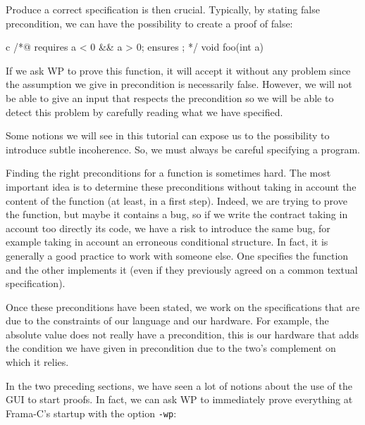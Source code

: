 Produce a correct specification is then crucial. Typically, by stating
false precondition, we can have the possibility to create a proof of
false:



\begin{CodeBlock}{c}
/*@
  requires a < 0 && a > 0;
  ensures  \false;
*/
void foo(int a){

}
\end{CodeBlock}


If we ask WP to prove this function, it will accept it without any problem
since the assumption we give in precondition is necessarily false.
However, we will not be able to give an input that respects the
precondition so we will be able to detect this problem by carefully
reading what we have specified.



Some notions we will see in this tutorial can expose us to the
possibility to introduce subtle incoherence. So, we must always be
careful specifying a program.





Finding the right preconditions for a function is sometimes hard. The
most important idea is to determine these preconditions without taking
in account the content of the function (at least, in a first step).
Indeed, we are trying to prove the function, but maybe it contains a bug,
so if we write the contract taking in account too directly its code, we
have a risk to introduce the same bug, for example taking in account an
erroneous conditional structure. In fact, it is generally a good
practice to work with someone else. One specifies the function and the
other implements it (even if they previously agreed on a common textual
specification).



Once these preconditions have been stated, we work on the
specifications that are due to the constraints of our language and our
hardware. For example, the absolute value does not really have a
precondition, this is our hardware that adds the condition we have given
in precondition due to the two's complement on which it relies.





In the two preceding sections, we have seen a lot of notions about the
use of the GUI to start proofs. In fact, we can ask WP to immediately
prove everything at Frama-C's startup with the option \texttt{-wp}:



